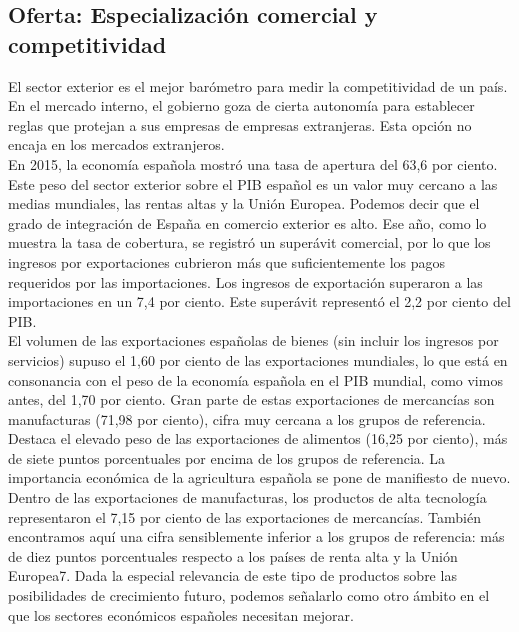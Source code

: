     \subsection{Oferta: Especialización comercial y competitividad}
    El sector exterior es el mejor barómetro para medir la competitividad de un país. En el mercado interno, el gobierno goza de cierta autonomía para establecer reglas que protejan a sus empresas de empresas extranjeras. Esta opción no encaja en los mercados extranjeros.\\
    En 2015, la economía española mostró una tasa de apertura del 63,6 por ciento. Este peso del sector exterior sobre el PIB español es un valor muy cercano a las medias mundiales, las rentas altas y la Unión Europea. Podemos decir que el grado de integración de España en comercio exterior es alto. Ese año, como lo muestra la tasa de cobertura, se registró un superávit comercial, por lo que los ingresos por exportaciones cubrieron más que suficientemente los pagos requeridos por las importaciones. Los ingresos de exportación superaron a las importaciones en un 7,4 por ciento. Este superávit representó el 2,2 por ciento del PIB.\\
    El volumen de las exportaciones españolas de bienes (sin incluir los ingresos por servicios) supuso el 1,60 por ciento de las exportaciones mundiales, lo que está en consonancia con el peso de la economía española en el PIB mundial, como vimos antes, del 1,70 por ciento. Gran parte de estas exportaciones de mercancías son manufacturas (71,98 por ciento), cifra muy cercana a los grupos de referencia. Destaca el elevado peso de las exportaciones de alimentos (16,25 por ciento), más de siete puntos porcentuales por encima de los grupos de referencia. La importancia económica de la agricultura española se pone de manifiesto de nuevo.\\
    Dentro de las exportaciones de manufacturas, los productos de alta tecnología representaron el 7,15 por ciento de las exportaciones de mercancías. También encontramos aquí una cifra sensiblemente inferior a los grupos de referencia: más de diez puntos porcentuales respecto a los países de renta alta y la Unión Europea7. Dada la especial relevancia de este tipo de productos sobre las posibilidades de crecimiento futuro, podemos señalarlo como otro ámbito en el que los sectores económicos españoles necesitan mejorar.\\

